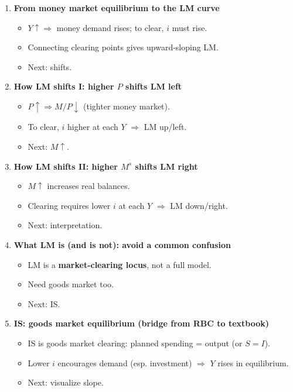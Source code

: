 \documentclass[11pt]{article}
\begin{document}
\begin{enumerate}
\item \textbf{From money market equilibrium to the LM curve}
\begin{itemize}
\item $Y\uparrow \Rightarrow$ money demand rises; to clear, $i$ must rise.
\item Connecting clearing points gives upward-sloping LM.
\item Next: shifts.
\end{itemize}

\item \textbf{How LM shifts I: higher $P$ shifts LM left}
\begin{itemize}
\item $P\uparrow \Rightarrow M/P\downarrow$ (tighter money market).
\item To clear, $i$ higher at each $Y$ $\Rightarrow$ LM up/left.
\item Next: $M\uparrow$.
\end{itemize}

\item \textbf{How LM shifts II: higher $M^s$ shifts LM right}
\begin{itemize}
\item $M\uparrow$ increases real balances.
\item Clearing requires lower $i$ at each $Y$ $\Rightarrow$ LM down/right.
\item Next: interpretation.
\end{itemize}

\item \textbf{What LM is (and is not): avoid a common confusion}
\begin{itemize}
\item LM is a \textbf{market-clearing locus}, not a full model.
\item Need goods market too.
\item Next: IS.
\end{itemize}

\item \textbf{IS: goods market equilibrium (bridge from RBC to textbook)}
\begin{itemize}
\item IS is goods market clearing: planned spending = output (or $S=I$).
\item Lower $i$ encourages demand (esp. investment) $\Rightarrow$ $Y$ rises in equilibrium.
\item Next: visualize slope.
\end{itemize}


\end{enumerate}
\end{document}
